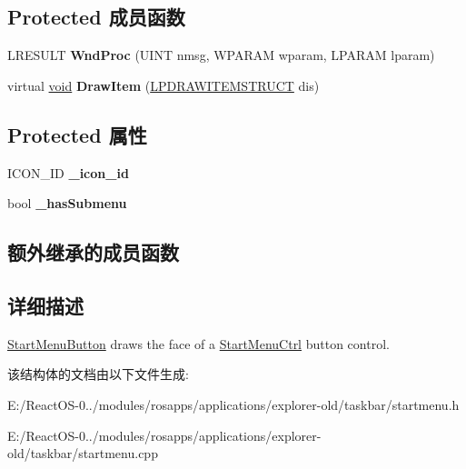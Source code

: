\subsection*{Protected 成员函数}
\begin{DoxyCompactItemize}
\item 
\mbox{\label{struct_start_menu_button_a9a383ffe35951a8237938b17e1ed67c0}} 
L\+R\+E\+S\+U\+LT {\bfseries Wnd\+Proc} (U\+I\+NT nmsg, W\+P\+A\+R\+AM wparam, L\+P\+A\+R\+AM lparam)
\item 
\mbox{\label{struct_start_menu_button_a27681b901a7bc99837972f87358813eb}} 
virtual \hyperlink{interfacevoid}{void} {\bfseries Draw\+Item} (\hyperlink{structtag_d_r_a_w_i_t_e_m_s_t_r_u_c_t}{L\+P\+D\+R\+A\+W\+I\+T\+E\+M\+S\+T\+R\+U\+CT} dis)
\end{DoxyCompactItemize}
\subsection*{Protected 属性}
\begin{DoxyCompactItemize}
\item 
\mbox{\label{struct_start_menu_button_a1c513cfb302b257cdd245c7d9acb351a}} 
I\+C\+O\+N\+\_\+\+ID {\bfseries \+\_\+icon\+\_\+id}
\item 
\mbox{\label{struct_start_menu_button_aead0e372a4deb2505a63f671d7dfacf7}} 
bool {\bfseries \+\_\+has\+Submenu}
\end{DoxyCompactItemize}
\subsection*{额外继承的成员函数}


\subsection{详细描述}
\hyperlink{struct_start_menu_button}{Start\+Menu\+Button} draws the face of a \hyperlink{struct_start_menu_ctrl}{Start\+Menu\+Ctrl} button control. 

该结构体的文档由以下文件生成\+:\begin{DoxyCompactItemize}
\item 
E\+:/\+React\+O\+S-\/0../modules/rosapps/applications/explorer-\/old/taskbar/startmenu.\+h\item 
E\+:/\+React\+O\+S-\/0../modules/rosapps/applications/explorer-\/old/taskbar/startmenu.\+cpp\end{DoxyCompactItemize}
